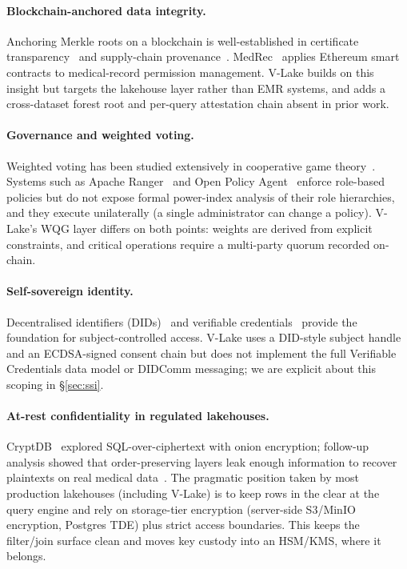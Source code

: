 \documentclass[10pt,twocolumn]{article}
\begin{document}
\paragraph{Blockchain-anchored data integrity.}
Anchoring Merkle roots on a blockchain is well-established in
certificate transparency~\cite{laurie2014ct} and supply-chain
provenance~\cite{toyoda2017supply}. MedRec~\cite{azaria2016medrec}
applies Ethereum smart contracts to medical-record permission
management. V-Lake builds on this insight but targets the lakehouse
layer rather than EMR systems, and adds a cross-dataset forest root
and per-query attestation chain absent in prior work.

\paragraph{Governance and weighted voting.}
Weighted voting has been studied extensively in cooperative game
theory~\cite{shapley1954method}. Systems such as Apache
Ranger~\cite{ranger} and Open Policy Agent~\cite{opa} enforce
role-based policies but do not expose formal power-index analysis
of their role hierarchies, and they execute unilaterally (a single
administrator can change a policy). V-Lake's WQG layer differs on
both points: weights are derived from explicit constraints, and
critical operations require a multi-party quorum recorded on-chain.

\paragraph{Self-sovereign identity.}
Decentralised identifiers (DIDs)~\cite{w3cdid} and verifiable
credentials~\cite{w3cvc} provide the foundation for
subject-controlled access. V-Lake uses a DID-style subject handle
and an ECDSA-signed consent chain but does not implement the full
Verifiable Credentials data model or DIDComm messaging; we are
explicit about this scoping in \S\ref{sec:ssi}.

\paragraph{At-rest confidentiality in regulated lakehouses.}
CryptDB~\cite{popa2011cryptdb} explored SQL-over-ciphertext with
onion encryption; follow-up analysis showed that
order-preserving layers leak enough information to recover
plaintexts on real medical data~\cite{naveed2015inference}. The
pragmatic position taken by most production lakehouses (including
V-Lake) is to keep rows in the clear at the query engine and rely
on storage-tier encryption (server-side S3/MinIO encryption,
Postgres TDE) plus strict access boundaries. This keeps the
filter/join surface clean and moves key custody into an HSM/KMS,
where it belongs.
\end{document}
